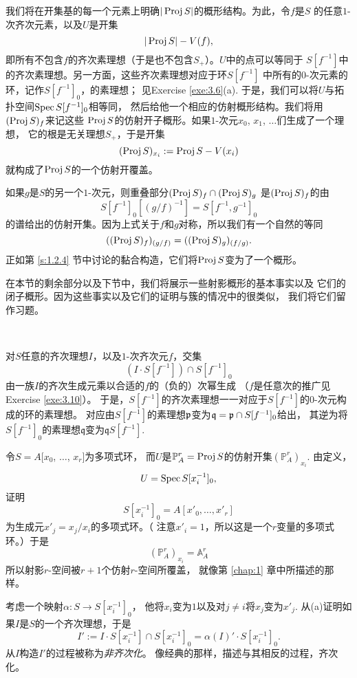 我们将在开集基的每一个元素上明确$|\operatorname{Proj} S|$的概形结构。为此，令$f$是$S$
的任意$1$-次齐次元素，以及$U$是开集
\[
	|\operatorname{Proj} S|-V(f),
\]
即所有不包含$f$的齐次素理想（于是也不包含$S_+$）。$U$中的点可以等同于
$S[f^{-1}]$中的齐次素理想。另一方面，这些齐次素理想对应于环$S[f^{-1}]$
中所有的$0$-次元素的环，记作$S[f^{-1}]_0$，的素理想；
见Exercise \ref{exe:3.6}(a). 
于是，我们可以将$U$与拓扑空间$\operatorname{Spec} S[f^{-1}]_0$相等同，
然后给他一个相应的仿射概形结构。我们将用$(\operatorname{Proj} S)_f$来记这些
$\operatorname{Proj} S$的仿射开子概形。如果$1$-次元$x_0$, $x_1$, $\dots$们生成了一个理想，
它的根是无关理想$S_+$，于是开集
\[
	(\operatorname{Proj} S)_{x_i}:=\operatorname{Proj} S-V(x_i)
\]
就构成了$\operatorname{Proj} S$的一个仿射开覆盖。

如果$g$是$S$的另一个$1$-次元，则重叠部分$(\operatorname{Proj} S)_f\cap (\operatorname{Proj} S)_g$
是$(\operatorname{Proj} S)_f$的由
\[
	S[f^{-1}]_0[(g/f)^{-1}]=S[f^{-1},g^{-1}]_0
\]
的谱给出的仿射开集。因为上式关于$f$和$g$对称，所以我们有一个自然的等同
\[
	((\operatorname{Proj} S)_f)_{(g/f)}=((\operatorname{Proj} S)_g)_{(f/g)}.
\]
正如第 \ref{s:1.2.4} 节中讨论的黏合构造，它们将$\operatorname{Proj} S$变为了一个概形。

在本节的剩余部分以及下节中，我们将展示一些射影概形的基本事实以及
它们的闭子概形。因为这些事实以及它们的证明与簇的情况中的很类似，
我们将它们留作习题。


\begin{exe}~\label{exe:3.6}
\begin{compactenum}[(a)]
\item 对$S$任意的齐次理想$I$，以及$1$-次齐次元$f$，交集
\[
	(I\cdot S[f^{-1}])\cap S[f^{-1}]_0
\]
由一族$I$的齐次生成元乘以合适的$f$的（负的）次幂生成
（$f$是任意次的推广见 Exercise \ref{exe:3.10}）。
于是，$S[f^{-1}]$的齐次素理想一一对应于$S[f^{-1}]$的$0$-次元构成的环的素理想。
对应由$S[f^{-1}]$的素理想$\mathfrak{p}$变为$\mathfrak q=\mathfrak{p}\cap S[f^{-1}]_0$给出，
其逆为将$S[f^{-1}]_0$的素理想$\mathfrak{q}$变为$\mathfrak qS[f^{-1}]$.

\item 令$S=A[x_0$, $\dots$, $x_r]$为多项式环，
而$U$是$\mathbb P_A^r=\operatorname{Proj} S$的仿射开集$(\mathbb P_A^r)_{x_i}$. 由定义，
\[
	U=\operatorname{Spec} S[x_i^{-1}]_0,
\]
证明
\[
	S[x_i^{-1}]_0=A[x'_0,\dots,x'_r]
\]
为生成元$x'_j=x_j/x_i$的多项式环。（
注意$x'_i=1$，所以这是一个$r$变量的多项式环。）于是
\[
	(\mathbb P^r_A)_{x_i}=\mathbb A_A^r
\]
所以射影$r$-空间被$r+1$个仿射$r$-空间所覆盖，
就像第 \ref{chap:1} 章中所描述的那样。

\item 考虑一个映射$\alpha:S\to S[x_i^{-1}]_0$，
他将$x_i$变为$1$以及对$j\neq i$将$x_j$变为$x'_j$. 
从(a)证明如果$I$是$S$的一个齐次理想，于是
\[
	I':=I\cdot S[x_i^{-1}]\cap S[x_i^{-1}]_0=\alpha(I)'\cdot S[x_i^{-1}]_0.
\]
从$I$构造$I'$的过程被称为\textit{非齐次化}。
像经典的那样，描述与其相反的过程，齐次化。
\end{compactenum}
\end{exe}

